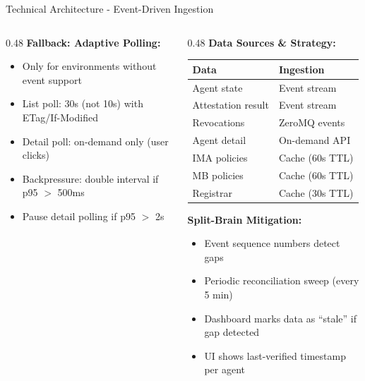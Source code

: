 \begin{frame}{Technical Architecture - Event-Driven Ingestion}
\begin{columns}[T]
\begin{column}{0.48\textwidth}
      \textbf{Fallback: Adaptive Polling:}
      \begin{itemize}
        \setlength{\itemsep}{0pt}
        \item Only for environments without event support
        \item List poll: 30s (not 10s) with ETag/If-Modified
        \item Detail poll: on-demand only (user clicks)
        \item Backpressure: double interval if p95 $>$ 500ms
        \item Pause detail polling if p95 $>$ 2s
      \end{itemize}
    \end{column}
    \begin{column}{0.48\textwidth}
      \textbf{Data Sources \& Strategy:}
      \begin{center}
        \begin{tabular}{|l|l|}
          \hline
          \textbf{Data} & \textbf{Ingestion} \\
          \hline
          Agent state & Event stream \\
          \hline
          Attestation result & Event stream \\
          \hline
          Revocations & ZeroMQ events \\
          \hline
          Agent detail & On-demand API \\
          \hline
          IMA policies & Cache (60s TTL) \\
          \hline
          MB policies & Cache (60s TTL) \\
          \hline
          Registrar & Cache (30s TTL) \\
          \hline
        \end{tabular}
      \end{center}

      \vspace{0.05cm}

      \textbf{Split-Brain Mitigation:}
      \begin{itemize}
        \setlength{\itemsep}{0pt}
        \item Event sequence numbers detect gaps
        \item Periodic reconciliation sweep (every 5 min)
        \item Dashboard marks data as ``stale'' if gap detected
        \item UI shows last-verified timestamp per agent
      \end{itemize}
    \end{column}
  \end{columns}
\end{frame}

